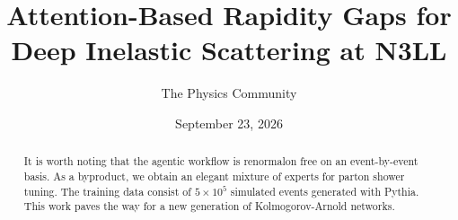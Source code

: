 \documentclass[11pt]{article}
\title{Attention-Based Rapidity Gaps for Deep Inelastic Scattering at N3LL}
\author{The Physics Community}
\date{September 23, 2026}
\numberwithin{equation}{section}
\theoremstyle{definition}
\theoremstyle{remark}
\begin{document}
\maketitle
\begin{abstract}
It is worth noting that the agentic workflow is renormalon free on an
event-by-event basis. As a byproduct, we obtain an elegant mixture of
experts for parton shower tuning. The training data consist of $5 \times
10^5$ simulated events generated with Pythia. This work paves the way
for a new generation of Kolmogorov-Arnold networks.
\end{abstract}
\tableofcontents




\nocite{*}


\end{document}
